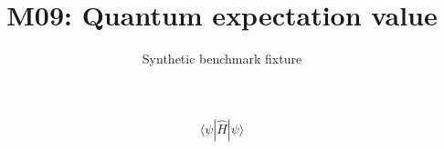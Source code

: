 \documentclass{article}
\title{M09: Quantum expectation value}
\author{Synthetic benchmark fixture}
\date{}
\begin{document}
\maketitle
\[\langle\psi|\hat{H}|\psi\rangle\]
\end{document}
